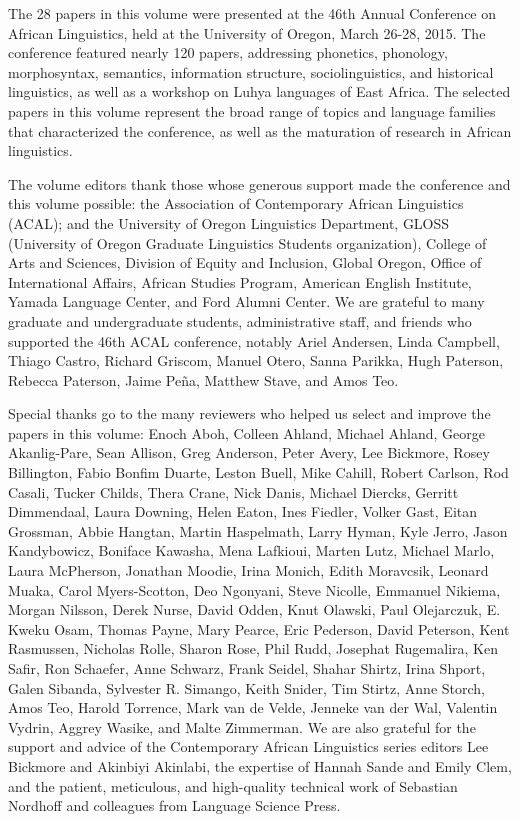 \largerpage
The 28 papers in this volume were presented at the 46th Annual Conference on African Linguistics, held at the University of Oregon, March 26-28, 2015. The conference featured nearly 120 papers, addressing phonetics, phonology, morphosyntax, semantics, information structure, sociolinguistics, and historical linguistics, as well as a workshop on Luhya languages of East Africa. The selected papers in this volume represent the broad range of topics and language families that characterized the conference, as well as the maturation of research in African linguistics.

The volume editors thank those whose generous support made the conference and this volume possible: the Association of Contemporary African Linguistics (ACAL); 
and the University of Oregon Linguistics Department, 
 GLOSS (University of Oregon Graduate Linguistics Students organization), 
 College of Arts and Sciences, 
 Division of Equity and Inclusion, 
 Global Oregon, 
 Office of International Affairs,
 African Studies Program,
 American English Institute, 
 Yamada Language Center, 
 and Ford Alumni Center.
We are grateful to many graduate and undergraduate students, administrative staff, and friends who supported the 46th ACAL conference, notably 
  Ariel Andersen, 
  Linda Campbell, 
  Thiago Castro,
  Richard Griscom, 
  Manuel Otero,
  Sanna Parikka, 
  Hugh Paterson, 
  Rebecca Paterson, 
  Jaime Pe\~na,
  Matthew Stave, 
  and Amos Teo.

Special thanks go to the many reviewers who helped us select and improve the papers in this volume: 
Enoch Aboh,
Colleen Ahland,
Michael Ahland,
George Akanlig-Pare,
Sean Allison,
Greg Anderson,
Peter Avery,
Lee Bickmore,
Rosey Billington,
Fabio Bonfim Duarte,
Leston Buell,
Mike Cahill,
Robert Carlson,
Rod Casali,
Tucker Childs,
Thera Crane,
Nick Danis,
Michael Diercks,
Gerritt Dimmendaal,
Laura Downing,
Helen Eaton,
Ines Fiedler,
Volker Gast,
Eitan Grossman,
Abbie Hangtan,
Martin Haspelmath,
Larry Hyman,
Kyle Jerro,
Jason Kandybowicz,
Boniface Kawasha,
Mena Lafkioui,
Marten Lutz,
Michael Marlo,
Laura McPherson,
Jonathan Moodie,
Irina Monich,
Edith Moravcsik,
Leonard Muaka,
Carol Myers-Scotton,
Deo Ngonyani,
Steve Nicolle,
Emmanuel Nikiema,
Morgan Nilsson,
Derek Nurse,
David Odden,
Knut Olawski,
Paul Olejarczuk,
E. Kweku Osam,
Thomas Payne,
Mary Pearce,
Eric Pederson,
David Peterson,
Kent Rasmussen,
Nicholas Rolle,
Sharon Rose,
Phil Rudd,
Josephat Rugemalira,
Ken Safir,
Ron Schaefer,
Anne Schwarz,
Frank Seidel,
Shahar Shirtz,
Irina Shport,
Galen Sibanda,
Sylvester R. Simango,
Keith Snider,
Tim Stirtz,
Anne Storch,
Amos Teo,
Harold Torrence,
Mark van de Velde,
Jenneke van der Wal,
Valentin Vydrin,
Aggrey Wasike,
and Malte Zimmerman.
 We are also grateful for the support and advice of the Contemporary African Linguistics series editors Lee Bickmore and Akinbiyi Akinlabi, the expertise of Hannah Sande and Emily Clem, and the patient, meticulous, and high-quality technical work of Sebastian Nordhoff and colleagues from Language Science Press. 
